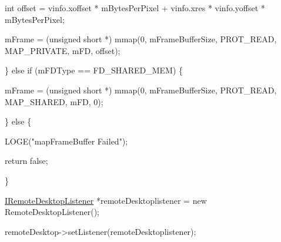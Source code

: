 \begin{DoxyPre}		 int offset = vinfo.xoffset * mBytesPerPixel + vinfo.xres * vinfo.yoffset * mBytesPerPixel;\end{DoxyPre}



\begin{DoxyPre}		 mFrame = (unsigned short *) mmap(0, mFrameBufferSize, PROT\_READ, MAP\_PRIVATE, mFD, offset);\end{DoxyPre}



\begin{DoxyPre}	 \} else if (mFDType == FD\_SHARED\_MEM) \{\end{DoxyPre}



\begin{DoxyPre}		 mFrame = (unsigned short *) mmap(0, mFrameBufferSize, PROT\_READ, MAP\_SHARED, mFD, 0);\end{DoxyPre}



\begin{DoxyPre}	 \} else \{\end{DoxyPre}



\begin{DoxyPre}		 LOGE("mapFrameBuffer Failed");\end{DoxyPre}



\begin{DoxyPre}		 return false;\end{DoxyPre}



\begin{DoxyPre}	 \}\end{DoxyPre}



\begin{DoxyPre}	 \hyperlink{classknoxremotedesktop_1_1IRemoteDesktopListener}{IRemoteDesktopListener} *remoteDesktoplistener = new RemoteDesktopListener();\end{DoxyPre}



\begin{DoxyPre}	 remoteDesktop->setListener(remoteDesktoplistener);\end{DoxyPre}



\begin{DoxyPre} \end{DoxyPre}


